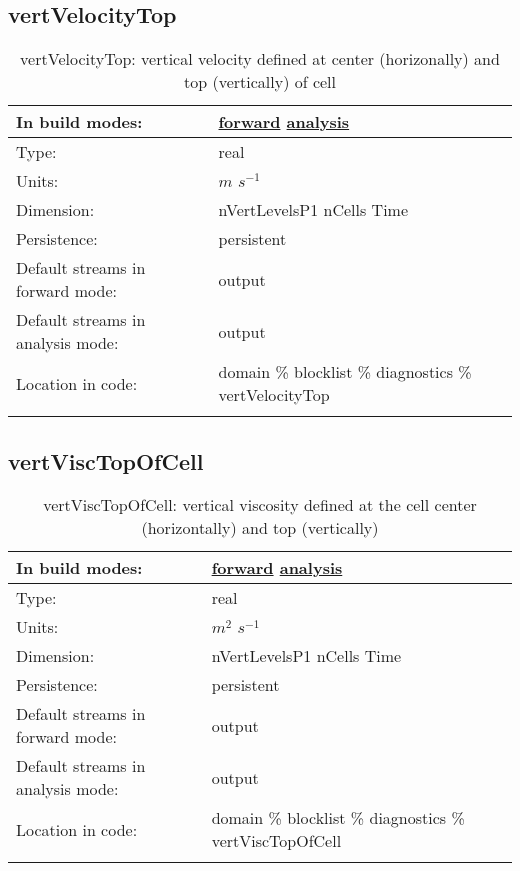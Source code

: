 \subsection[vertVelocityTop]{vertVelocityTop}
\label{subsec:var_sec_diagnostics_vertVelocityTop}
\begin{center}
\begin{longtable}{| p{2.0in} | p{4.0in} |}
        \hline 
        In build modes: & \hyperref[subsec:forward_var_tab_diagnostics]{forward} \hyperref[subsec:analysis_var_tab_diagnostics]{analysis} \\
        \hline 
        Type: & real \\
        \hline 
        Units: & $m$ $s^{-1}$ \\
        \hline 
        Dimension: & nVertLevelsP1 nCells Time \\
        \hline 
        Persistence: & persistent \\
        \hline 
		 Default streams in forward mode: &  output \\
        \hline 
		 Default streams in analysis mode: &  output \\
        \hline 
		 Location in code: & domain \% blocklist \% diagnostics \% vertVelocityTop \\
		 \hline 
    \caption{vertVelocityTop: vertical velocity defined at center (horizonally) and top (vertically) of cell}
\end{longtable}
\end{center}
\subsection[vertViscTopOfCell]{vertViscTopOfCell}
\label{subsec:var_sec_diagnostics_vertViscTopOfCell}
\begin{center}
\begin{longtable}{| p{2.0in} | p{4.0in} |}
        \hline 
        In build modes: & \hyperref[subsec:forward_var_tab_diagnostics]{forward} \hyperref[subsec:analysis_var_tab_diagnostics]{analysis} \\
        \hline 
        Type: & real \\
        \hline 
        Units: & $m^2$ $s^{-1}$ \\
        \hline 
        Dimension: & nVertLevelsP1 nCells Time \\
        \hline 
        Persistence: & persistent \\
        \hline 
		 Default streams in forward mode: &  output \\
        \hline 
		 Default streams in analysis mode: &  output \\
        \hline 
		 Location in code: & domain \% blocklist \% diagnostics \% vertViscTopOfCell \\
		 \hline 
    \caption{vertViscTopOfCell: vertical viscosity defined at the cell center (horizontally) and top (vertically)}
\end{longtable}
\end{center}
